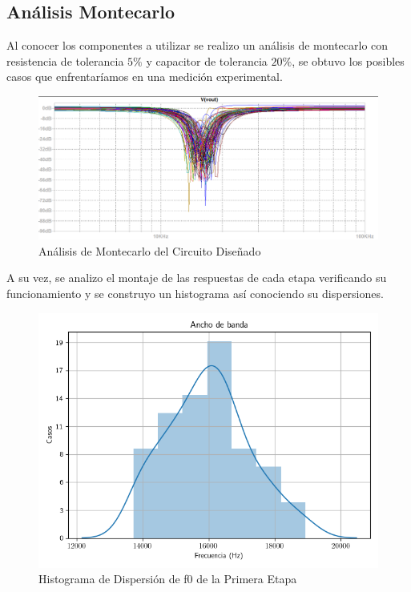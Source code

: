 \subsection{Análisis Montecarlo}

Al conocer los componentes a utilizar se realizo un análisis de montecarlo con resistencia de tolerancia $5\%$ y capacitor de tolerancia $20\%$, se obtuvo los posibles casos que enfrentaríamos en una medición experimental.

\begin{figure}
    \centering
    \includegraphics[scale = 0.6]{../Ejercicio2-DisenoDeCeldas/4CeldaUniversal/Informe/monte.PNG}
    \caption{Análisis de Montecarlo del Circuito Diseñado}
    \label{fig:my_label}
\end{figure}

A su vez, se analizo el montaje de las respuestas de cada etapa verificando su funcionamiento y se construyo un histograma así conociendo su dispersiones.

\begin{figure}[H]
    \centering
    \includegraphics[scale = 0.4]{../Ejercicio2-DisenoDeCeldas/4CeldaUniversal/Informe/dis1.png}
    \caption{Histograma de Dispersión de f0 de la Primera Etapa}
    \label{ej4dis1}
\end{figure}

